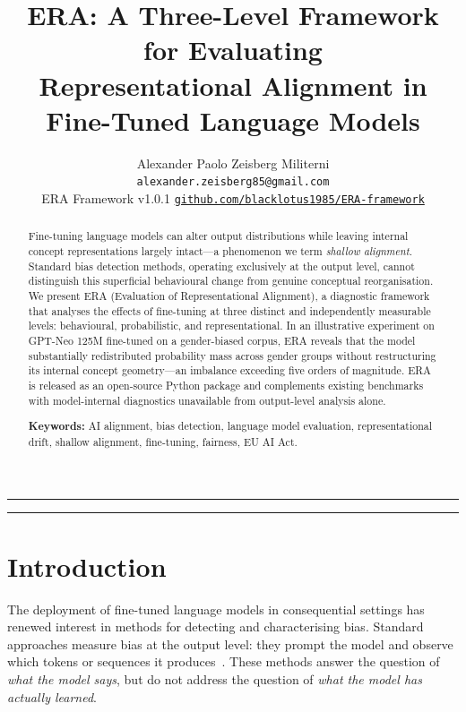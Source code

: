 \documentclass[11pt,a4paper]{article}
\title{\textbf{ERA: A Three-Level Framework for Evaluating\\
Representational Alignment in Fine-Tuned Language Models}}
\author{Alexander Paolo Zeisberg Militerni\\
\small\texttt{alexander.zeisberg85@gmail.com}\\[4pt]
\small ERA Framework v1.0.1\quad
\href{https://github.com/blacklotus1985/ERA-framework}%
     {\texttt{github.com/blacklotus1985/ERA-framework}}}
\date{}
\begin{document}
\maketitle
\hrule
\vspace{6pt}

\begin{abstract}
Fine-tuning language models can alter output distributions while leaving internal
concept representations largely intact---a phenomenon we term \emph{shallow alignment}.
Standard bias detection methods, operating exclusively at the output level, cannot
distinguish this superficial behavioural change from genuine conceptual reorganisation.
We present ERA (Evaluation of Representational Alignment), a diagnostic framework that
analyses the effects of fine-tuning at three distinct and independently measurable
levels: behavioural, probabilistic, and representational. In an illustrative experiment
on GPT-Neo 125M fine-tuned on a gender-biased corpus, ERA reveals that the model
substantially redistributed probability mass across gender groups without restructuring
its internal concept geometry---an imbalance exceeding five orders of magnitude. ERA
is released as an open-source Python package and complements existing benchmarks with
model-internal diagnostics unavailable from output-level analysis alone.

\medskip\noindent
\textbf{Keywords:} AI alignment, bias detection, language model evaluation,
representational drift, shallow alignment, fine-tuning, fairness, EU AI Act.
\end{abstract}

\hrule
\vspace{8pt}

\section{Introduction}

The deployment of fine-tuned language models in consequential settings has renewed
interest in methods for detecting and characterising bias. Standard approaches measure
bias at the output level: they prompt the model and observe which tokens or sequences
it produces~\cite{caliskan2017,nadeem2021,zhao2018}. These methods answer the question
of \emph{what the model says}, but do not address the question of \emph{what the model
has actually learned}.
\end{document}
